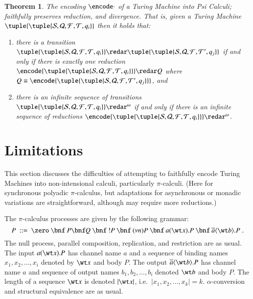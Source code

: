 \documentclass[submission,copyright,creativecommons]{eptcs}
\newtheorem{theorem}{Theorem}[section]
\newcommand{\tmach}[1]{\tuple{\tuple{#1}}}
\begin{document}
\begin{theorem}
\label{thm:psi:done}
The encoding $\encode\cdot$ of a Turing Machine into Psi Calculi;
faithfully preserves reduction, and
divergence.
That is, given a Turing Machine $\tmach{{\mathcal S}, {\mathcal Q}, {\mathcal F}, {\mathcal T}, q_i}$
then it holds that:
\begin{enumerate}
\item there is a transition
$\tmach{{\mathcal S}, {\mathcal Q}, {\mathcal F}, {\mathcal T}, q_i}\redar
\tmach{{\mathcal S}, {\mathcal Q}, {\mathcal F}, {\mathcal T}', q_j}$
if and only if there is exactly one reduction
$\encode{\tmach{{\mathcal S}, {\mathcal Q}, {\mathcal F}, {\mathcal T}, q_i}}\redar Q$
where $Q\equiv\encode{\tmach{{\mathcal S}, {\mathcal Q}, {\mathcal F}, {\mathcal T}', q_j}}$, and
\item there is an infinite sequence of transitions
$\tmach{{\mathcal S}, {\mathcal Q}, {\mathcal F}, {\mathcal T}, q_i}\redar^\omega$
if and only if there is an infinite sequence of reductions
$\encode{\tmach{{\mathcal S}, {\mathcal Q}, {\mathcal F}, {\mathcal T}, q_i}}\redar^\omega$.
\end{enumerate}
\end{theorem}

\section{Limitations}
\label{sec:fail}

\newcommand{\ifte}[4]{{\sf if}\ #1=#2\ {\sf then}\ #3\ {\sf else}\ #4}
\newcommand{\piiap}[2]{#1(#2)}
\newcommand{\pioap}[2]{\overline{#1}\langle #2\rangle}

This section discusses the difficulties of attempting to faithfully encode Turing Machines
into non-intensional calculi, particularly $\pi$-calculi. (Here for synchronous polyadic $\pi$-calculus, but
adaptations for asynchronous or monadic variations are straightforward, although may require
more reductions.)




The $\pi$-calculus processes are given by the following grammar:
$$
P \ ::= \ \zero \ \bnf \ 
P \bnf Q \ \bnf \ !P \ \bnf \ (\nu n) P \ \bnf \ 
\piiap a {\wt x}.P\ \bnf \ \pioap a {\wt b}.P\; .
$$
The null process, parallel composition, replication, and restriction are as usual.
The input $\piiap a {\wt x}.P$ has channel name $a$ and a sequence of binding names
$x_1,x_2,\ldots,x_i$ denoted by $\wt x$ and body $P$.
The output $\pioap a {\wt b} .P$ has channel name $a$ and sequence of output names
$b_1,b_2,\ldots,b_i$ denoted $\wt b$ and body $P$.
The length of a sequence $\wt x$ is denoted $|\wt x|$,
i.e.~$|x_1,x_2,\ldots,x_k|=k$.
$\alpha$-conversion and structural equivalence are as usual.
\end{document}
